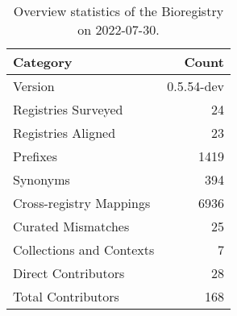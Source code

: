 \begin{table}
\centering
\caption{Overview statistics of the Bioregistry on 2022-07-30.}
\label{tab:bioregistry-summary}
\begin{tabular}{lr}
\toprule
                Category &      Count \\
\midrule
                 Version & 0.5.54-dev \\
     Registries Surveyed &         24 \\
      Registries Aligned &         23 \\
                Prefixes &       1419 \\
                Synonyms &        394 \\
 Cross-registry Mappings &       6936 \\
      Curated Mismatches &         25 \\
Collections and Contexts &          7 \\
     Direct Contributors &         28 \\
      Total Contributors &        168 \\
\bottomrule
\end{tabular}
\end{table}
